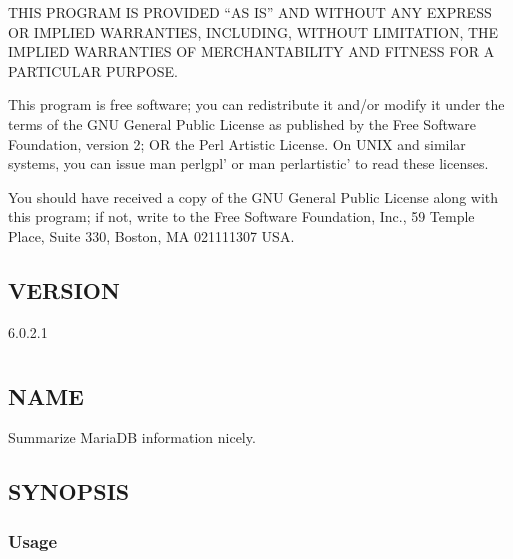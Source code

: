 \documentclass[letterpaper,10pt,english]{sphinxmanual}
\begin{document}
THIS PROGRAM IS PROVIDED “AS IS” AND WITHOUT ANY EXPRESS OR IMPLIED
WARRANTIES, INCLUDING, WITHOUT LIMITATION, THE IMPLIED WARRANTIES OF
MERCHANTABILITY AND FITNESS FOR A PARTICULAR PURPOSE.

This program is free software; you can redistribute it and/or modify it under
the terms of the GNU General Public License as published by the Free Software
Foundation, version 2; OR the Perl Artistic License.  On UNIX and similar
systems, you can issue \textasciigrave{}man perlgpl’ or \textasciigrave{}man perlartistic’ to read these
licenses.

You should have received a copy of the GNU General Public License along with
this program; if not, write to the Free Software Foundation, Inc., 59 Temple
Place, Suite 330, Boston, MA  02111\sphinxhyphen{}1307  USA.


\section{VERSION}
\label{\detokenize{mariadb-config-diff:version}}
 6.0.2.1


\chapter{}
\label{\detokenize{mariadb-database-summary:mariadb-database-summary}}\label{\detokenize{mariadb-database-summary::doc}}

\section{NAME}
\label{\detokenize{mariadb-database-summary:name}}
 \sphinxhyphen{} Summarize MariaDB information nicely.


\section{SYNOPSIS}
\label{\detokenize{mariadb-database-summary:synopsis}}

\subsection{Usage}
\label{\detokenize{mariadb-database-summary:usage}}
\begin{sphinxVerbatim}[commandchars=\\\{\}]
 \PYG{p}{[}\PYG{p}{]}
\end{sphinxVerbatim}
\end{document}
